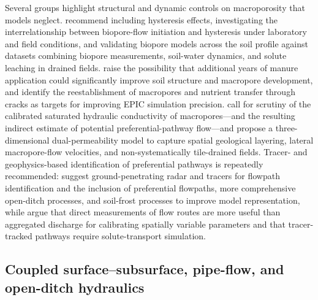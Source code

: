 \documentclass[11pt]{article}
\begin{document}
Several groups highlight structural and dynamic controls on macroporosity that
models neglect. \textcite{Holbak2021} recommend including hysteresis effects,
investigating the interrelationship between biopore-flow initiation and
hysteresis under laboratory and field conditions, and validating biopore
models across the soil profile against datasets combining biopore
measurements, soil-water dynamics, and solute leaching in drained fields.
\textcite{Zhao2001} raise the possibility that additional years of manure
application could significantly improve soil structure and macropore
development, and \textcite{Wang2022} identify the reestablishment of
macropores and nutrient transfer through cracks as targets for improving EPIC
simulation precision. \textcite{Varvaris2018} call for scrutiny of the
calibrated saturated hydraulic conductivity of macropores---and the resulting
indirect estimate of potential preferential-pathway flow---and propose a
three-dimensional dual-permeability model to capture spatial geological
layering, lateral macropore-flow velocities, and non-systematically
tile-drained fields. Tracer- and geophysics-based identification of
preferential pathways is repeatedly recommended: \textcite{Tähtikarhu2025}
suggest ground-penetrating radar and tracers for flowpath identification and
the inclusion of preferential flowpaths, more comprehensive open-ditch
processes, and soil-frost processes to improve model representation, while
\textcite{Salo2017} argue that direct measurements of flow routes are more
useful than aggregated discharge for calibrating spatially variable parameters
and that tracer-tracked pathways require solute-transport simulation.

\subsection{Coupled surface--subsurface, pipe-flow, and open-ditch hydraulics}
\end{document}
